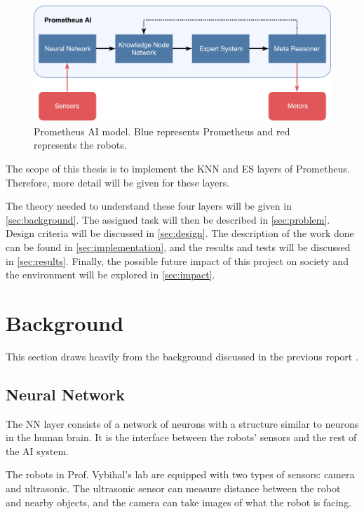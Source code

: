 \documentclass[titlepage,11pt]{article}
\begin{document}
\begin{figure}[!htb]
	\includegraphics[width=\textwidth]{figures/ai_model.pdf}
	\caption[Prometheus AI model.]{Prometheus AI model. Blue represents Prometheus and red represents the robots.}
	\label{model}
\end{figure}

The scope of this thesis is to implement the KNN and ES layers of Prometheus. Therefore, more detail will be given for these layers.

The theory needed to understand these four layers will be given in \autoref{sec:background}. The assigned task will then be described in \autoref{sec:problem}. Design criteria will be discussed in \autoref{sec:design}. The description of the work done can be found in \autoref{sec:implementation}, and the results and tests will be discussed in \autoref{sec:results}. Finally, the possible future impact of this project on society and the environment will be explored in \autoref{sec:impact}.

\section{Background} \label{sec:background}
This section draws heavily from the background discussed in the previous report \cite{stappas}.

\subsection{Neural Network}

The NN layer consists of a network of neurons with a structure similar to neurons in the human brain. It is the interface between the robots' sensors and the rest of the AI system.

The robots in Prof. Vybihal's lab are equipped with two types of sensors: camera and ultrasonic. The ultrasonic sensor can measure distance between the robot and nearby objects, and the camera can take images of what the robot is facing.
\end{document}
